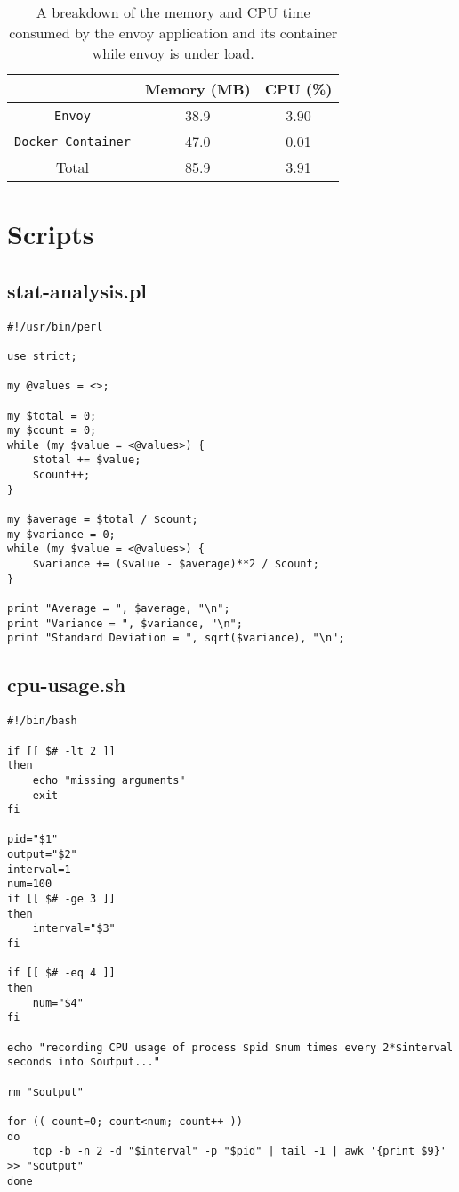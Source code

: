 \documentclass{article}
\begin{document}
\begin{table}[H]
\begin{tabular}{ |c|c|c| }
 \hline
   & Memory (MB) & CPU (\%) \\ 
 \hline
 \texttt{Envoy} & 38.9 & 3.90 \\
 \hline
 \texttt{Docker Container} & 47.0 & 0.01 \\
 \hline\hline
 Total & 85.9 & 3.91 \\
 \hline
\end{tabular}
\caption{A breakdown of the memory and CPU time consumed by the envoy application and its container while envoy is under load.}
\label{app-consumption-under-load-breakdown}
\end{table}

\section{Scripts}
\subsection{stat-analysis.pl}
\begin{verbatim}
#!/usr/bin/perl

use strict;

my @values = <>;

my $total = 0;
my $count = 0;
while (my $value = <@values>) {
    $total += $value;
    $count++;
}

my $average = $total / $count;
my $variance = 0;
while (my $value = <@values>) {
    $variance += ($value - $average)**2 / $count;
}

print "Average = ", $average, "\n";
print "Variance = ", $variance, "\n";
print "Standard Deviation = ", sqrt($variance), "\n";
\end{verbatim}

\subsection{cpu-usage.sh}
\begin{verbatim}
#!/bin/bash

if [[ $# -lt 2 ]]
then
    echo "missing arguments"
    exit
fi

pid="$1"
output="$2"
interval=1
num=100
if [[ $# -ge 3 ]]
then
    interval="$3"
fi

if [[ $# -eq 4 ]]
then
    num="$4"
fi

echo "recording CPU usage of process $pid $num times every 2*$interval seconds into $output..."

rm "$output"

for (( count=0; count<num; count++ ))
do
    top -b -n 2 -d "$interval" -p "$pid" | tail -1 | awk '{print $9}' >> "$output"
done
\end{verbatim}
\end{document}
